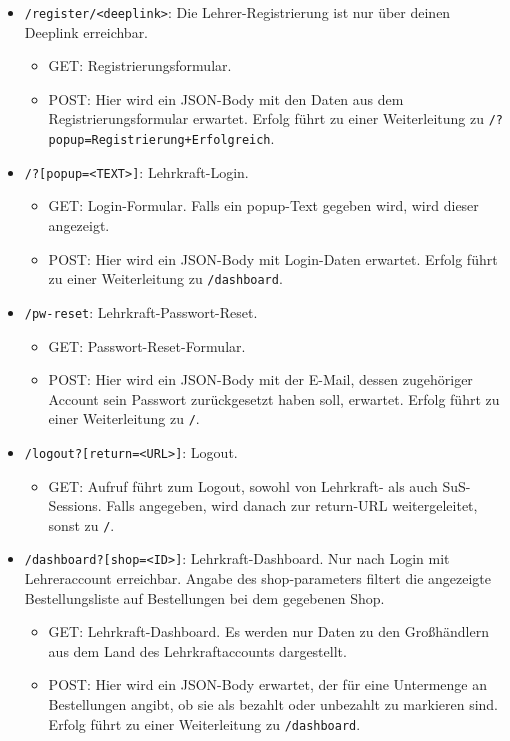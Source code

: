 \begin{itemize}
	\item \texttt{/register/<deeplink>}: Die Lehrer-Registrierung ist nur über deinen Deeplink erreichbar.
		\begin{itemize}
			\item GET: Registrierungsformular.
			\item POST: Hier wird ein JSON-Body mit den Daten aus dem Registrierungsformular erwartet. Erfolg führt zu einer Weiterleitung zu \texttt{/?popup=Registrierung+Erfolgreich}.
		\end{itemize}
	\item \texttt{/?[popup=<TEXT>]}: Lehrkraft-Login.
		\begin{itemize}
			\item GET: Login-Formular. Falls ein popup-Text gegeben wird, wird dieser angezeigt.
			\item POST: Hier wird ein JSON-Body mit Login-Daten erwartet. Erfolg führt zu einer Weiterleitung zu \texttt{/dashboard}.
		\end{itemize}
	\item \texttt{/pw-reset}: Lehrkraft-Passwort-Reset.
		\begin{itemize}
			\item GET: Passwort-Reset-Formular.
			\item POST: Hier wird ein JSON-Body mit der E-Mail, dessen zugehöriger Account sein Passwort zurückgesetzt haben soll, erwartet. Erfolg führt zu einer Weiterleitung zu \texttt{/}.
		\end{itemize}
	\item \texttt{/logout?[return=<URL>]}: Logout.
		\begin{itemize}
			\item GET: Aufruf führt zum Logout, sowohl von Lehrkraft- als auch SuS-Sessions. Falls angegeben, wird danach zur return-URL weitergeleitet, sonst zu \texttt{/}.
		\end{itemize}
	\item \texttt{/dashboard?[shop=<ID>]}: Lehrkraft-Dashboard. Nur nach Login mit Lehreraccount erreichbar. Angabe des shop-parameters filtert die angezeigte Bestellungsliste auf Bestellungen bei dem gegebenen Shop.
		\begin{itemize}
			\item GET: Lehrkraft-Dashboard. Es werden nur Daten zu den Großhändlern aus dem Land des Lehrkraftaccounts dargestellt.
			\item POST: Hier wird ein JSON-Body erwartet, der für eine Untermenge an Bestellungen angibt, ob sie als bezahlt oder unbezahlt zu markieren sind. Erfolg führt zu einer Weiterleitung zu \texttt{/dashboard}.
		\end{itemize}
\end{itemize}

